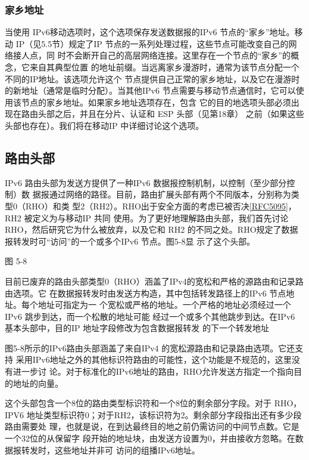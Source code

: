 \subsubsection{家乡地址}
当使用 IPv6移动选项时，这个选项保存发送数据报的IPv6 节点的“家乡”地址。移动
IP（见5.5节）规定了IP 节点的一系列处理过程，这些节点可能改变自己的网络接人点，同
时不会断开自己的高层网络连接。这里存在一个节点的“家乡”的概念，它来自其典型位置
的地址前缀。当远离家乡漫游时，通常为该节点分配一个不同的IP地址。该选项允许这个
节点提供自己正常的家乡地址，以及它在漫游时的新地址（通常是临时分配）。当其他IPv6
节点需要与移动节点通信时，它可以使用该节点的家乡地址。如果家乡地址选项存在，包含
它的目的地选项头部必须出现在路由头部之后，并且在分片、认证和 ESP 头部（见第18章）
之前（如果这些头部也存在）。我们将在移动IP 中详细讨论这个选项。

\subsection{路由头部}
IPv6 路由头部为发送方提供了一种IPv6 数据报控制机制，以控制（至少部分控制）数
据报通过网络的路径。目前，路由扩展头部有两个不同版本，分别称为类型0（RHO）和类
型2（RH2）。RHO出于安全方面的考虑已被否决\href{https://www.rfc-editor.org/rfc/rfc5095}{[RFC5095]}，RH2 被定义为与移动IP 共同
使用。为了更好地理解路由头部，我们首先讨论 RHO，然后研究它为什么被放弃，以及它和
RH2 的不同之处。RHO规定了数据报转发时可“访问”的一个或多个IPv6 节点。图5-8显
示了这个头部。


图 5-8

目前已废弃的路由头部类型0（RHO）涵盖了IPv4的宽松和严格的源路由和记录路由选项。它
在数据报转发时由发送方构造，其中包括转发路径上的IPv6 节点地址。每个地址可指定为一
个宽松或严格的地址。一个严格的地址必须经过一个 IPv6 跳步到达，而一个松散的地址可能
经过一个或多个其他跳步到达。在IPv6 基本头部中，目的IP 地址字段修改为包含数据报转发
的下一个转发地址

图5-8所示的IPv6路由头部涵盖了来自IPv4 的宽松源路由和记录路由选项。它还支持
采用IPv6地址之外的其他标识符路由的可能性，这个功能是不规范的，这里没有进一步讨
论。对于标准化的IPv6地址的路由，RHO允许发送方指定一个指向目的地址的向量。

这个头部包含一个8位的路由类型标识符和一个8位的剩余部分字段。对于 RHO，IPV6
地址类型标识符0；对于RH2，该标识符为2。剩余部分字段指出还有多少段路由需要处
理，也就是说，在到达最终目的地之前仍需访问的中间节点数。它是一个32位的从保留字
段开始的地址块，由发送方设置为0，并由接收方忽略。在数据报转发时，这些地址并非可
访问的组播IPv6地址。

